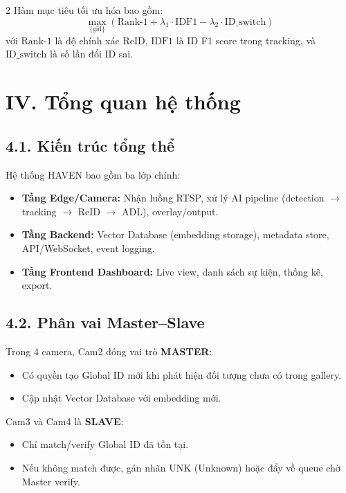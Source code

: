 \documentclass[a4paper,13pt]{article}
\begin{document}
\begin{multicols}{2}
Hàm mục tiêu tối ưu hóa bao gồm:
\begin{equation}
\max_{\{\text{gid}\}} \left( \text{Rank-1} + \lambda_1 \cdot \text{IDF1} - \lambda_2 \cdot \text{ID\_switch} \right)
\label{eq:objective}
\end{equation}
với $\text{Rank-1}$ là độ chính xác ReID, $\text{IDF1}$ là ID F1 score trong tracking, và $\text{ID\_switch}$ là số lần đổi ID sai.

\section*{IV. Tổng quan hệ thống}

\subsection*{4.1. Kiến trúc tổng thể}
Hệ thống HAVEN bao gồm ba lớp chính:
\begin{itemize}
    \item \textbf{Tầng Edge/Camera:} Nhận luồng RTSP, xử lý AI pipeline (detection $\to$ tracking $\to$ ReID $\to$ ADL), overlay/output.
    \item \textbf{Tầng Backend:} Vector Database (embedding storage), metadata store, API/WebSocket, event logging.
    \item \textbf{Tầng Frontend Dashboard:} Live view, danh sách sự kiện, thống kê, export.
\end{itemize}


\subsection*{4.2. Phân vai Master--Slave}
Trong 4 camera, Cam2 đóng vai trò \textbf{MASTER}:
\begin{itemize}
    \item Có quyền tạo Global ID mới khi phát hiện đối tượng chưa có trong gallery.
    \item Cập nhật Vector Database với embedding mới.
\end{itemize}

Cam3 và Cam4 là \textbf{SLAVE}:
\begin{itemize}
    \item Chỉ match/verify Global ID đã tồn tại.
    \item Nếu không match được, gán nhãn UNK (Unknown) hoặc đẩy về queue chờ Master verify.
\end{itemize}


\end{multicols}
\end{document}

